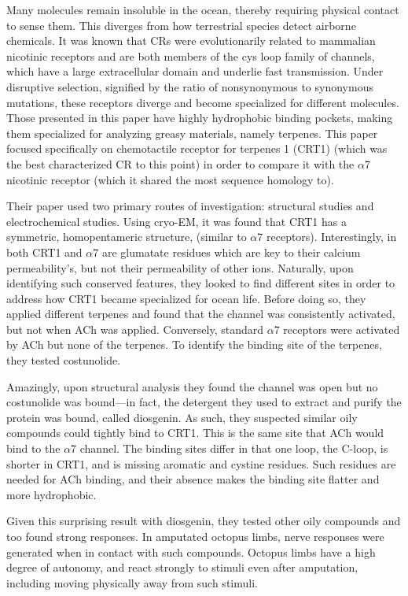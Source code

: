 Many molecules remain insoluble in the ocean, thereby requiring physical contact to sense them. This diverges from how terrestrial species detect airborne chemicals. It was known that CRs were evolutionarily related to mammalian nicotinic receptors and are both members of the cys loop family of channels, which have a large extracellular domain and underlie fast transmission. Under disruptive selection, signified by the ratio of nonsynonymous to synonymous mutations, these receptors diverge and become specialized for different molecules. Those presented in this paper have highly hydrophobic binding pockets, making them specialized for analyzing greasy materials, namely terpenes. This paper focused specifically on chemotactile receptor for terpenes 1 (CRT1) (which was the best characterized CR to this point) in order to compare it with the $\alpha$7 nicotinic receptor (which it shared the most sequence homology to).\newline

Their paper used two primary routes of investigation: structural studies and electrochemical studies. Using cryo-EM, it was found that CRT1 has a symmetric, homopentameric structure, (similar to $\alpha$7 receptors). Interestingly, in both CRT1 and $\alpha$7 are glumatate residues which are key to their calcium permeability's, but not their permeability of other ions. Naturally, upon identifying such conserved features, they looked to find different sites in order to address how CRT1 became specialized for ocean life. Before doing so, they applied different terpenes and found that the channel was consistently activated, but not when ACh was applied. Conversely, standard $\alpha$7 receptors were activated by ACh but none of the terpenes. To identify the binding site of the terpenes, they tested costunolide.\newline

Amazingly, upon structural analysis they found the channel was open but no costunolide was bound---in fact, the detergent they used to extract and purify the protein was bound, called diosgenin. As such, they suspected similar oily compounds could tightly bind to CRT1. This is the same site that ACh would bind to the $\alpha$7 channel. The binding sites differ in that one loop, the C-loop, is shorter in CRT1, and is missing aromatic and cystine residues. Such residues are needed for ACh binding, and their absence makes the binding site flatter and more hydrophobic.\newline

Given this surprising result with diosgenin, they tested other oily compounds and too found strong responses. In amputated octopus limbs, nerve responses were generated when in contact with such compounds. Octopus limbs have a high degree of autonomy, and react strongly to stimuli even after amputation, including moving physically away from such stimuli.


